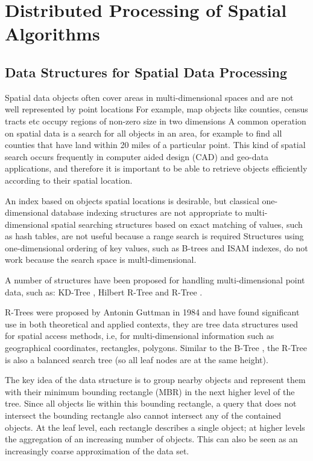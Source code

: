\section{Distributed Processing of Spatial Algorithms}
\label{sec:spatial_dist}

\subsection{Data Structures for Spatial Data Processing}
\label{sub:spatialdata}

	Spatial data objects often cover areas in multi-dimensional spaces and are not well represented by point locations For example, map objects like counties, census  tracts etc occupy regions of non-zero size  in two dimensions A common operation on spatial data is a search for all objects in an area, for example to find all counties that have land within 20 miles of a particular point. This kind of spatial search occurs frequently in computer aided design (CAD) and geo-data applications, and therefore it is important to be able to retrieve objects efficiently according to their spatial location. 
	
	An index based on objects spatial locations is desirable, but classical one-dimensional database indexing structures are not appropriate to multi-dimensional spatial searching structures based on exact matching of values, such as hash tables, are not useful because a range search is required Structures using one-dimensional ordering of key values, such as B-trees \cite{bayer1970BTree,bentley1975BTree} and ISAM indexes, do not work because the search space is multl-dimensional. 
		
	A number of structures have been proposed for handling multi-dimensional point data, such as: KD-Tree \cite{bentley1975multidimensional}, Hilbert R-Tree \cite{kamel1994hilbert} and R-Tree \cite{guttman1984r}.
	
	R-Trees were proposed by Antonin Guttman in 1984 and have found significant use in both theoretical and applied contexts, they are tree data structures used for spatial access methods, i.e, for multi-dimensional information such as geographical coordinates, rectangles, polygons. Similar to the B-Tree \cite{comer1979ubiquitous}, the R-Tree is also a balanced search tree (so all leaf nodes are at the same height).

	The key idea of the data structure is to group nearby objects and represent them with their minimum bounding rectangle (MBR) in the next higher level of the tree. Since all objects lie within this bounding rectangle, a query that does not intersect the bounding rectangle also cannot intersect any of the contained objects. At the leaf level, each rectangle describes a single object; at higher levels the aggregation of an increasing number of objects. This can also be seen as an increasingly coarse approximation of the data set.

